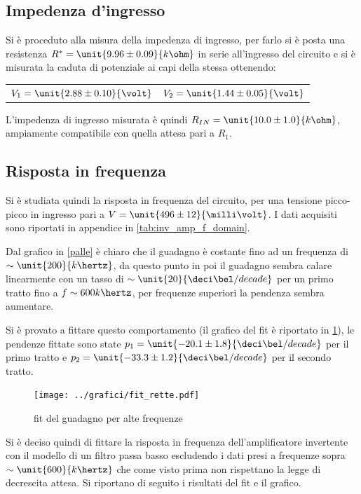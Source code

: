 \documentclass[10pt,a4paper]{article}
\begin{document}
\subsection{Impedenza d'ingresso}
Si è proceduto alla misura della impedenza di ingresso, per farlo si è posta una resistenza $R^* = \unit{9.96 \pm 0.09}{k\ohm}$ in serie all'ingresso del circuito e si è misurata la caduta di potenziale ai capi della stessa ottenendo:
\begin{table}[H]
	\centering
	\begin{tabular}{cc}
		$V_1 = \unit{2.88 \pm 0.10}{\volt}$  &  $V_2=\unit{1.44 \pm 0.05}{\volt}$
	\end{tabular}
\end{table}
L'impedenza di ingresso misurata è quindi $R_{IN}=\unit{10.0 \pm 1.0}{k\ohm}$, ampiamente compatibile con quella attesa pari a $R_1$.

\subsection{Risposta in frequenza}
Si è studiata quindi la risposta in frequenza del circuito, per una tensione picco-picco in ingresso pari a $V = \unit{496 \pm 12}{\milli\volt}$. I dati acquisiti sono riportati in appendice in \tablename{\ref{tab:inv_amp_f_domain}}.

Dal grafico in \figurename{\ref{palle}} è chiaro che il guadagno è costante fino ad un frequenza di $\sim \unit{200}{k\hertz}$, da questo punto in poi il guadagno sembra calare linearmente con un tasso di $\sim \unit{20}{\deci\bel /decade}$ per un primo tratto fino a $f \sim {600}{k\hertz}$, per frequenze superiori la pendenza sembra aumentare.

Si è provato a fittare questo comportamento (il grafico del fit è riportato in \figurename{\ref{rette}}), le pendenze fittate sono state $p_1 = \unit{-20.1 \pm 1.8}{\deci\bel/decade}$ per il primo tratto e $p_2 =\unit{-33.3 \pm 1.2}{\deci\bel/decade}$ per il secondo tratto.

\begin{figure}[H]
	\centering
	\texttt{[image: ../grafici/fit\_rette.pdf]}
	\caption{fit del guadagno per alte frequenze}
	\label{rette}
\end{figure}

Si è deciso quindi di fittare la risposta in frequenza dell'amplificatore invertente con il modello di un filtro passa basso escludendo i dati presi a frequenze sopra $\sim \unit{600}{k\hertz}$ che come visto prima non rispettano la legge di decrescita attesa.  Si riportano di seguito i risultati del fit e il grafico.
\end{document}
